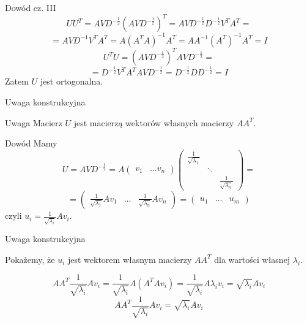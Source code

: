 \documentclass{beamer}
\begin{document}
\begin{frame}{Dowód cz. III}
    $$UU^T = AVD^{-\frac{1}{2}} (AVD^{-\frac{1}{2}})^T = AVD^{-\frac{1}{2}} D^{-\frac{1}{2}} V^T A^T = $$ 
    $$ = AVD^{-1}V^TA^T = A (A^TA)^{-1} A^T = A A^{-1} (A^T)^{-1} A^T = I$$
    $$U^TU = (AVD^{-\frac{1}{2}})^T AVD^{-\frac{1}{2}} = $$ 
    $$ = D^{-\frac{1}{2}} V^T A^TA V D^{-\frac{1}{2}} = D^{-\frac{1}{2}} D D^{-\frac{1}{2}} = I $$
    Zatem $U$ jest ortogonalna.
\end{frame}

\begin{frame}{Uwaga konstrukcyjna}
\begin{block}{Uwaga}
Macierz $U$ jest macierzą wektorów własnych macierzy $AA^T$.
\end{block}
\pause
\begin{block}{Dowód}
Mamy $$U = AVD^{-\frac{1}{2}} = A \begin{pmatrix} v_1 & \ldots v_n \end{pmatrix} \begin{pmatrix} 
\frac{1}{\sqrt{\lambda_1}} & & \\
 & \ddots & \\
 & & \frac{1}{\sqrt{\lambda_n}}
\end{pmatrix} =$$
$$
= \begin{pmatrix}
\frac{1}{\sqrt{\lambda_1}}Av_1 & \ldots & \frac{1}{\sqrt{\lambda_n}}Av_n 
\end{pmatrix} =
 \begin{pmatrix} u_1 & \ldots & u_m \end{pmatrix}$$ czyli $u_i = \frac{1}{\sqrt{\lambda_i}}Av_i$.
\end{block}
\end{frame}

\begin{frame}{Uwaga konstrukcyjna}
\begin{block}{}

Pokażemy, że $u_i$ jest wektorem własnym macierzy $AA^T$ dla wartości własnej $\lambda_i$.

$$ AA^T \frac{1}{\sqrt{\lambda_i}} Av_i  = \frac{1}{\sqrt{\lambda_i}} A (A^TAv_i) = \frac{1}{\sqrt{\lambda_i}} A \lambda_i v_i = \sqrt{\lambda_i}Av_i $$ 
$$ AA^T \frac{1}{\sqrt{\lambda_i}} Av_i = \sqrt{\lambda_i}Av_i $$ 
\end{block}
    
\end{frame}
\end{document}
